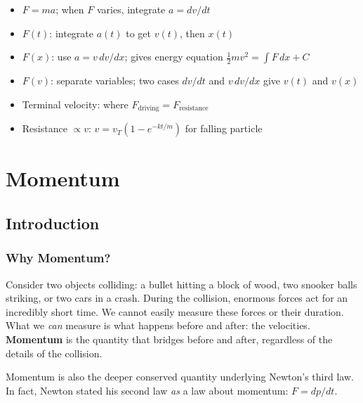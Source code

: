 \documentclass[12pt, a4paper]{book}
\begin{document}
\begin{summarybox}
\begin{itemize}[leftmargin=1.5em]
  \item $F = ma$; when $F$ varies, integrate $a = dv/dt$
  \item $F(t)$: integrate $a(t)$ to get $v(t)$, then $x(t)$
  \item $F(x)$: use $a = v\,dv/dx$; gives energy equation $\frac{1}{2}mv^2 = \int F\,dx + C$
  \item $F(v)$: separate variables; two cases $dv/dt$ and $v\,dv/dx$ give $v(t)$ and $v(x)$
  \item Terminal velocity: where $F_{\text{driving}} = F_{\text{resistance}}$
  \item Resistance $\propto v$: $v = v_T(1-e^{-kt/m})$ for falling particle
\end{itemize}
\end{summarybox}

\chapter{Momentum}

\section{Introduction}

\subsection{Why Momentum?}

\begin{intuitionbox}
Consider two objects colliding: a bullet hitting a block of wood, two snooker balls striking, or two cars in a crash. During the collision, enormous forces act for an incredibly short time. We cannot easily measure these forces or their duration. What we \emph{can} measure is what happens before and after: the velocities. \textbf{Momentum} is the quantity that bridges before and after, regardless of the details of the collision.
\end{intuitionbox}

Momentum is also the deeper conserved quantity underlying Newton's third law. In fact, Newton stated his second law \emph{as} a law about momentum: $F = dp/dt$.
\end{document}
